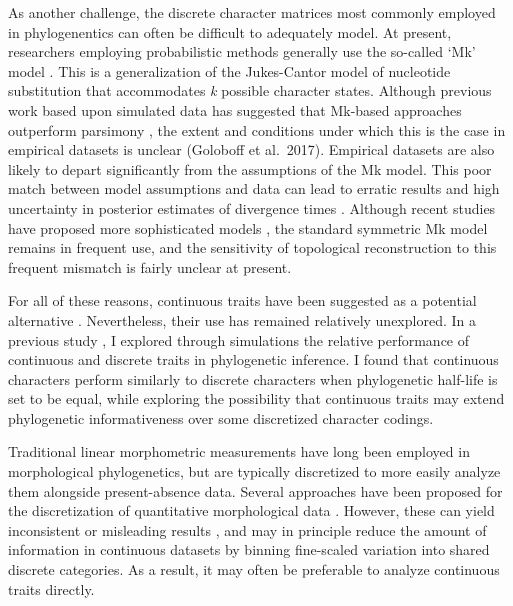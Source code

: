 \documentclass[12pt]{article}
\begin{document}
 As another challenge, the discrete character matrices most commonly employed in phylogenentics
can often be difficult to adequately model. At present, researchers
employing probabilistic methods generally use the so-called `Mk' model
\citep{lewis_mk}. This is a generalization of the Jukes-Cantor model of
nucleotide substitution that accommodates \emph{k} possible character
states. Although previous work based upon simulated data has suggested
that Mk-based approaches outperform parsimony \citep{wright2014bayesian},  the extent and conditions under which this is the
case in empirical datasets is unclear (Goloboff et al.~2017). Empirical
datasets are also likely to depart significantly from the assumptions of
the Mk model.  This poor match between model assumptions and data  can lead to erratic results and high uncertainty in
posterior estimates of divergence times \citep{ronquist2016closing}. Although recent studies have proposed more sophisticated models \citep{wright2016modeling}, the standard symmetric Mk model remains in frequent use, and  the sensitivity of topological reconstruction to this frequent mismatch is fairly unclear at present. 

For all of these reasons, continuous traits have been suggested as a
potential alternative \citep{felsenstein1973,felsenstein1988phylogenies,macleod2002phylogenetic}. 
Nevertheless, their use has remained relatively unexplored. In a previous study \citep{parins2017use}, 
I explored through simulations the relative performance of continuous and discrete traits in phylogenetic inference.
I found that continuous characters perform similarly to discrete characters when phylogenetic half-life is set to be equal,
while exploring the possibility that continuous traits may extend phylogenetic informativeness over some 
discretized character codings. 

Traditional linear morphometric measurements have long been employed in
morphological phylogenetics, but are typically discretized to more
easily analyze them alongside present-absence data. Several approaches have been proposed for the discretization of quantitative morphological data \citep{thiele1993holy,wiens2001character}.  However, these can yield inconsistent or misleading results \citep{rae1998logical,goloboff2006continuous}, and may in principle reduce  the amount of information in continuous
datasets by binning fine-scaled variation into shared discrete
categories. As a result, it may often be preferable to analyze continuous traits directly.
\end{document}
